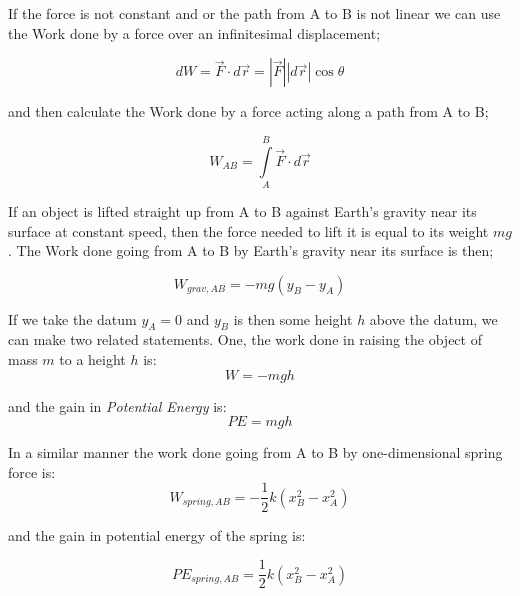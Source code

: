 \documentclass[12pt, letterpaper, twoside]{article}
\begin{document}
\bigskip


If the force is not constant and or the path from A to B is not linear we can use the Work done by a force over an infinitesimal displacement;

\begin{equation}
dW = \overrightarrow{F} \cdot d \overrightarrow{r} = | \overrightarrow{F} | | d \overrightarrow{r} | \cos \theta
\end{equation}

\bigskip

and then calculate the Work done by a force acting along a path from A to B;

\begin{equation}
W_{AB} = \int\limits_A^B \overrightarrow{F} \cdot d \overrightarrow{r}
\end{equation}

\bigskip

If an object is lifted straight up from A to B against Earth's gravity near its surface at constant speed, then the force needed to lift it is equal to its weight  $mg$ . The Work done going from A to B by Earth's gravity near its surface is then;

\begin{equation}
W_{grav,AB} = -mg(y_B - y_A)
\end{equation}

\bigskip

If we take the datum $y_A = 0$ and $y_B$ is then some height $h$ above the datum, we can make two related statements.
One, the work done in raising the object of mass $m$ to a height $h$ is:
\begin{equation}
W = -mgh
\end{equation}

\bigskip

and the gain in \emph{Potential Energy} is:
\begin{equation}
PE = mgh
\end{equation}


\bigskip

In a similar manner the work done going from A to B by one-dimensional spring force is:
\begin{equation}
W_{spring,AB} = - \frac{1}{2} k (x_B^2 - x_A^2)
\end{equation}
\bigskip

and the gain in potential energy of the spring is:

\begin{equation}
PE_{spring,AB} =  \frac{1}{2} k (x_B^2 - x_A^2)
\end{equation}
\bigskip
\end{document}
